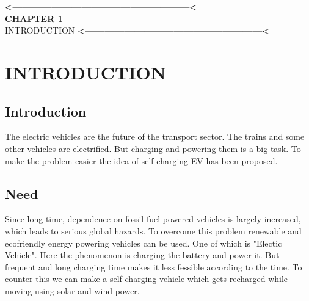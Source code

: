 \documentclass[a4paper,12pt]{article}
\begin{document}
\newpage
\tableofcontents
{}
\newpage
\listoffigures
{}




\newpage

\pagestyle{fancy}
\fancyhf{}
\fancyfoot[R]{\thepage}
\renewcommand{\footrulewidth}{1pt}


\newpage
\thispagestyle{empty}
\vspace*{0.25\textheight}
\begin{center}
\begin{center}
{\bfseries\LARGE <------------------------------------------------------<}\\
{\bfseries\LARGE CHAPTER 1}\\[2cm]


{\scshape\Huge INTRODUCTION}
{\bfseries\LARGE <------------------------------------------------------<}
\end{center}
\end{center}
\newpage

\section{INTRODUCTION}
\subsection{Introduction}
The electric vehicles are the future of the transport sector. The trains and some other vehicles are electrified. But charging and powering them is a big task. To make the problem easier the idea of self charging EV has been proposed. 

\subsection{Need}
Since long time, dependence on fossil fuel powered vehicles is largely increased, which leads to serious global hazards. To overcome this problem renewable and ecofriendly energy powering vehicles can be used. One of which is "Electic Vehicle". Here the phenomenon is charging the battery and power it. But frequent and long charging time makes it less fessible according to the time. To counter this we can make a self charging vehicle which gets recharged while moving using solar and wind power.
\end{document}
